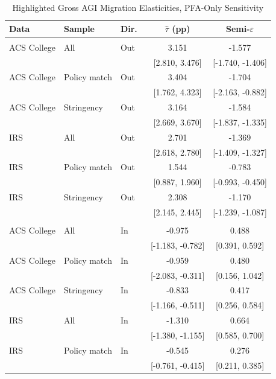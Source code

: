 \begin{table}[htbp]
\centering
\begin{threeparttable}
\footnotesize
\caption{Highlighted Gross AGI Migration Elasticities, PFA-Only Sensitivity}
\label{tab:elasticities_inout_pfa_only}
\begin{tabular}{lll cc}
\toprule
Data & Sample & Dir.\ & $\hat{\tau}$ (pp) & Semi-$\varepsilon$ \\
\midrule
\addlinespace
\multicolumn{5}{l}{\textit{Panel A: Out-Migration}} \\
\addlinespace
ACS College & All & Out & 3.151 & -1.577 \\
 & & & [2.810, 3.476] & [-1.740, -1.406] \\
ACS College & Policy match & Out & 3.404 & -1.704 \\
 & & & [1.762, 4.323] & [-2.163, -0.882] \\
ACS College & Stringency & Out & 3.164 & -1.584 \\
 & & & [2.669, 3.670] & [-1.837, -1.335] \\
\addlinespace
IRS & All & Out & 2.701 & -1.369 \\
 & & & [2.618, 2.780] & [-1.409, -1.327] \\
IRS & Policy match & Out & 1.544 & -0.783 \\
 & & & [0.887, 1.960] & [-0.993, -0.450] \\
IRS & Stringency & Out & 2.308 & -1.170 \\
 & & & [2.145, 2.445] & [-1.239, -1.087] \\
\addlinespace[0.75em]
\midrule
\addlinespace
\multicolumn{5}{l}{\textit{Panel B: In-Migration}} \\
\addlinespace
ACS College & All & In & -0.975 & 0.488 \\
 & & & [-1.183, -0.782] & [0.391, 0.592] \\
ACS College & Policy match & In & -0.959 & 0.480 \\
 & & & [-2.083, -0.311] & [0.156, 1.042] \\
ACS College & Stringency & In & -0.833 & 0.417 \\
 & & & [-1.166, -0.511] & [0.256, 0.584] \\
\addlinespace
IRS & All & In & -1.310 & 0.664 \\
 & & & [-1.380, -1.155] & [0.585, 0.700] \\
IRS & Policy match & In & -0.545 & 0.276 \\
 & & & [-0.761, -0.415] & [0.211, 0.385] \\

\end{tabular}
\end{threeparttable}
\end{table}
